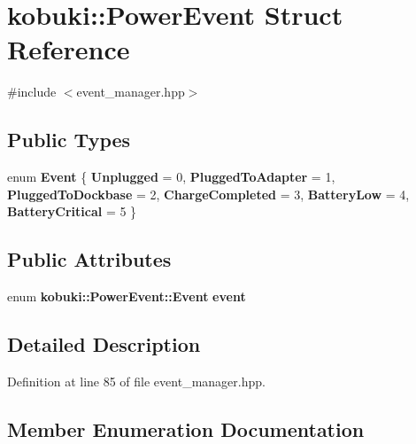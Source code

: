 \section{kobuki\-:\-:\-Power\-Event \-Struct \-Reference}
\label{structkobuki_1_1PowerEvent}


{\ttfamily \#include $<$event\-\_\-manager.\-hpp$>$}

\subsection*{\-Public \-Types}
\begin{DoxyCompactItemize}
\item 
enum {\bf \-Event} \{ \*
{\bf \-Unplugged} =  0, 
{\bf \-Plugged\-To\-Adapter} =  1, 
{\bf \-Plugged\-To\-Dockbase} =  2, 
{\bf \-Charge\-Completed} =  3, 
\*
{\bf \-Battery\-Low} =  4, 
{\bf \-Battery\-Critical} =  5
 \}
\end{DoxyCompactItemize}
\subsection*{\-Public \-Attributes}
\begin{DoxyCompactItemize}
\item 
enum {\bf kobuki\-::\-Power\-Event\-::\-Event} {\bf event}
\end{DoxyCompactItemize}


\subsection{\-Detailed \-Description}


\-Definition at line 85 of file event\-\_\-manager.\-hpp.



\subsection{\-Member \-Enumeration \-Documentation}
